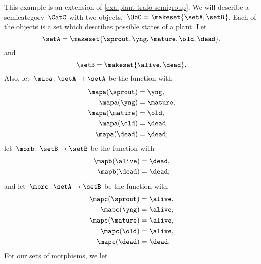 \begin{example}
    \label{exa:semicat-plant-states}
    This example is an extension of \cref{exa:plant-trafo-semigroup}.
    We will describe a semicategory~$\CatC$ with two objects,~$\ObC = \makeset{ \setA, \setB }$.
    Each of the objects is a set which describes possible states of a plant.
    Let
    \begin{equation}
        \setA = \makeset{ \sprout, \yng, \mature, \old, \dead },
    \end{equation}
    and
    \begin{equation}
        \setB = \makeset{ \alive, \dead }.
    \end{equation}
    Also, let~$\mapa \colon \setA \to \setA$ be the function with
    \begin{equation}
        \begin{aligned}
            \mapa(\sprout) & =  \yng, \\
            \mapa(\yng)    & =  \mature, \\
            \mapa(\mature) & =  \old, \\
            \mapa( \old)   & = \dead, \\
            \mapa(\dead)   & = \dead;
        \end{aligned}
    \end{equation}
    let~$\morb \colon \setB \to \setB$ be the function with
    \begin{equation}
        \begin{aligned}
            \mapb(\alive) & =  \dead, \\
            \mapb(\dead)  & =  \dead;
        \end{aligned}
    \end{equation}
    and let~$\morc \colon \setA \to \setB$ be the function with
    \begin{equation}
        \begin{aligned}
            \mapc(\sprout) & = \alive, \\
            \mapc(\yng)    & =  \alive, \\
            \mapc(\mature) & = \alive , \\
            \mapc( \old)   & = \alive, \\
            \mapc (\dead)  & = \dead.
        \end{aligned}
    \end{equation}
    For our sets of morphisms, we let
    \begin{equation}
        \begin{aligned}

\end{aligned}
\end{equation}
\end{example}
